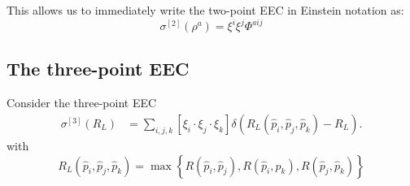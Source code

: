 \documentclass{article}
\begin{document}
This allows us to immediately write the two-point EEC in Einstein notation as:
\begin{equation}
    \sigma^{[2]}(\rho^a) = \xi^i \xi^j \Phi^{a ij}
\end{equation}

\subsection{The three-point EEC}

Consider the three-point EEC
\begin{align}
    \sigma^{[3]}(R_L) &= \sum_{i, j, k} \left[ \xi_{i}\cdot \xi_{j}\cdot \xi_{k}\right] \delta( R_L(\hat{p}_{i}, \hat{p}_{j}, \hat{p}_{k})  - R_L).
\end{align}
with 
\begin{equation}
    R_L(\hat{p}_{i}, \hat{p}_{j}, \hat{p}_{k}) = \max\left\{ R(\hat{p}_{i}, \hat{p}_{j}), R(\hat{p}_{i}, \hat{p}_{k}), R(\hat{p}_{j}, \hat{p}_{k})\right\}
\end{equation}
\end{document}
